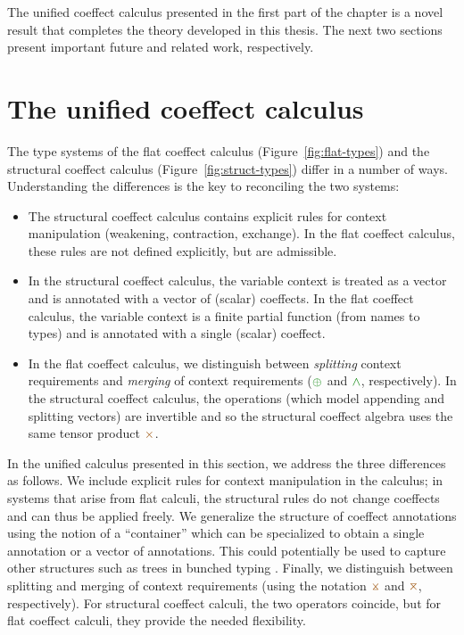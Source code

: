 \noindent
The unified coeffect calculus presented in the first part of the chapter is a novel result that
completes the theory developed in this thesis. The next two sections present important future and
related work, respectively.


\section{The unified coeffect calculus}
\label{sec:unified-unified}

The type systems of the flat coeffect calculus (Figure~\ref{fig:flat-types}) and the structural 
coeffect calculus (Figure~\ref{fig:struct-types}) differ in a number of ways. Understanding the 
differences is the key to reconciling the two systems:

\begin{itemize}
\item The structural coeffect calculus contains explicit rules for context manipulation
  (weakening, contraction, exchange). In the flat coeffect calculus, these rules are not defined
  explicitly, but are admissible.

\item In the structural coeffect calculus, the variable context is treated as a vector
  and is annotated with a vector of (scalar) coeffects. In the flat coeffect calculus,
  the variable context is a finite partial function (from names to types) and is annotated with 
  a single (scalar) coeffect.

\item In the flat coeffect calculus, we distinguish between \emph{splitting} context requirements
  and \emph{merging} of context requirements ($\cpar$ and $\czip$, respectively). In the structural
  coeffect calculus, the operations (which model appending and splitting vectors) are invertible 
  and so the structural coeffect algebra uses the same tensor product $\atimes$.
\end{itemize}

\noindent
In the unified calculus presented in this section, we address the three differences as follows.
We include explicit rules for context manipulation in the calculus; in systems that arise from flat
calculi, the structural rules do not change coeffects and can thus be applied freely. We generalize 
the structure of coeffect annotations using the notion of a ``container'' which can be specialized 
to obtain a single annotation or a vector of annotations. This could potentially be used to capture
other structures such as trees in bunched typing \cite{substruct-bunched}. Finally, we distinguish 
between splitting and merging of context requirements (using the notation $\apar$ and $\azip$, 
respectively). For structural coeffect calculi, the two operators coincide, but for flat
coeffect calculi, they provide the needed flexibility.

